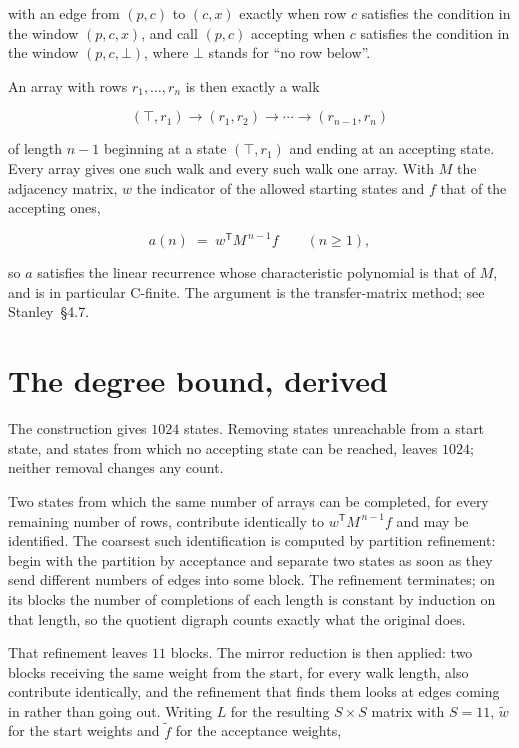 \documentclass[11pt]{article}
\theoremstyle{definition}
\begin{document}
with an edge from $(p,c)$ to $(c,x)$ exactly when row $c$ satisfies the condition in the window $(p,c,x)$, and call $(p,c)$ accepting when $c$ satisfies the condition in the window $(p,c,\bot)$, where $\bot$ stands for ``no row below''.

An array with rows $r_1,\dots,r_n$ is then exactly a walk

\[(\top,r_1) \to (r_1,r_2) \to \cdots \to (r_{n-1},r_n)\]

of length $n-1$ beginning at a state $(\top,r_1)$ and ending at an accepting state. Every array gives one such walk and every such walk one array. With $M$ the adjacency matrix, $w$ the indicator of the allowed starting states and $f$ that of the accepting ones,

\[a(n) \;=\; w^{\mathsf T} M^{\,n-1} f \qquad (n \ge 1),\]

so $a$ satisfies the linear recurrence whose characteristic polynomial is that of $M$, and is in particular C-finite. The argument is the transfer-matrix method; see Stanley~\S4.7.

\section{The degree bound, derived}

The construction gives $1024$ states. Removing states unreachable from a start state, and states from which no accepting state can be reached, leaves $1024$; neither removal changes any count.

Two states from which the same number of arrays can be completed, for every remaining number of rows, contribute identically to $w^{\mathsf T}M^{\,n-1}f$ and may be identified. The coarsest such identification is computed by partition refinement: begin with the partition by acceptance and separate two states as soon as they send different numbers of edges into some block. The refinement terminates; on its blocks the number of completions of each length is constant by induction on that length, so the quotient digraph counts exactly what the original does.

That refinement leaves $11$ blocks. The mirror reduction is then applied: two blocks receiving the same weight from the start, for every walk length, also contribute identically, and the refinement that finds them looks at edges coming in rather than going out. Writing $L$ for the resulting $S \times S$ matrix with $S = 11$, $\tilde w$ for the start weights and $\tilde f$ for the acceptance weights,
\end{document}
